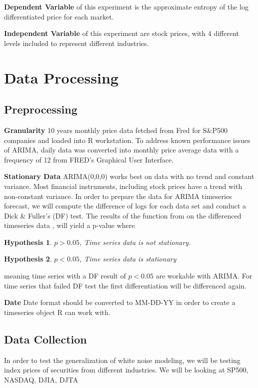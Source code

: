 \documentclass{article}[12pt]
\newtheorem*{hyp*}{Hypothesis \protect\hypnumber} %
\newenvironment{hyp}[1]{\renewcommand{\hypnumber}{#1}\begin{hyp*}}{\end{hyp*}}
\newcommand{\hypnumber}{}
\begin{document}
            \textbf{Dependent Variable} of this experiment is the approximate entropy of the log differentiated price for each market.
            \medskip

            \textbf{Independent Variable} of this experiment are stock prices, with 4 different levels included to represent different industries.

        \section{Data Processing}
            \subsection{Preprocessing}
                \textbf{Granularity} 10 years monthly price data fetched from Fred for S\&P500 companies and loaded into R workstation. To address known performance issues of ARIMA, daily data was converted into monthly price average data with a frequency of 12 from FRED's Graphical User Interface.

                \textbf{Stationary Data} ARIMA(0,0,0) works best on data with no trend and constant variance. Most financial instruments, including stock prices have a trend with non-constant variance. In order to prepare the data for ARIMA timeseries forecast, we will compute the difference of logs for each data set and conduct a Dick \& Fuller's (DF) test. The  results of the function  from  on the differenced timeseries data , will yield a p-value where 
                \begin{hyp}{0} 
                    $p>0.05$, Time series data is not stationary.
                \end{hyp}
                \begin{hyp}{1} 
                    $p<0.05$, Time series data is stationary
                \end{hyp}
                meaning time series with a DF result of $p<0.05$ are workable with ARIMA. For time series that failed DF test the first differentiation will be differenced again.

                \textbf{Date} Date format should be converted to MM-DD-YY in order to create a timeseries object R can work with.

            \subsection{Data Collection}
                In order to test the generalization of white noise modeling, we will be testing index prices of securities from different industries. We will be looking at SP500, NASDAQ, DJIA, DJTA 
                
\end{document}
